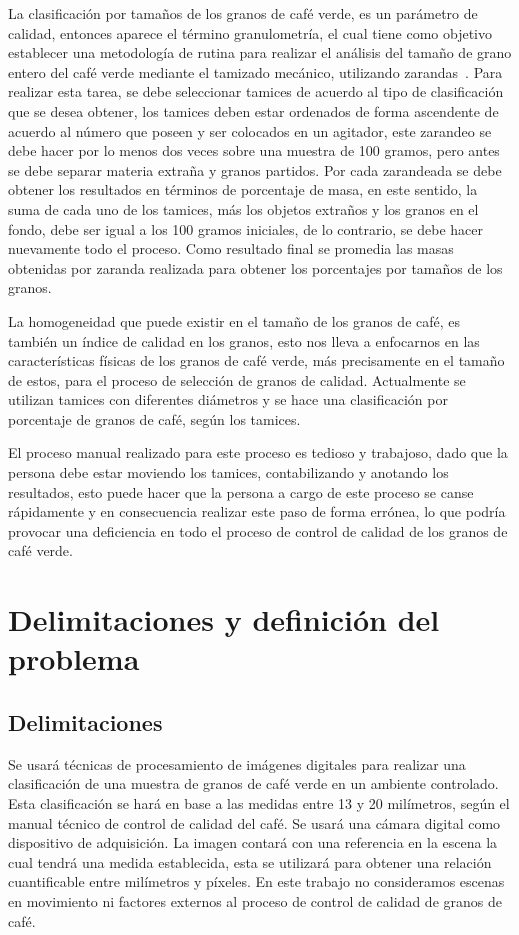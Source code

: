 La clasificación por tamaños de los granos de café verde, es un parámetro de calidad, entonces aparece el término granulometría, el cual tiene como objetivo establecer una metodología de rutina para realizar el análisis del tamaño de grano entero del café verde mediante el tamizado mecánico, utilizando zarandas~\citep{Funez2010}. Para realizar esta tarea, se debe seleccionar tamices de acuerdo al tipo de clasificación que se desea obtener, los tamices deben estar ordenados de forma ascendente de acuerdo al número que poseen y ser colocados en un agitador, este zarandeo se debe hacer por lo menos dos veces sobre una muestra de 100 gramos, pero antes se debe separar materia extraña y granos partidos. Por cada zarandeada se debe obtener los resultados en términos de porcentaje de masa, en este sentido, la suma de cada uno de los tamices, más los objetos extraños y los granos en el fondo, debe ser igual a los 100 gramos iniciales, de lo contrario, se debe hacer nuevamente todo el proceso. Como resultado final se promedia las masas obtenidas por zaranda realizada para obtener los porcentajes por tamaños de los granos.

La homogeneidad que puede existir en el tamaño de los granos de café, es también un índice de calidad en los granos, esto nos lleva a enfocarnos en las características físicas de los granos de café verde, más precisamente en el tamaño de estos, para el proceso de selección de granos de calidad. Actualmente se utilizan tamices con diferentes diámetros y se hace una clasificación por porcentaje de granos de café, según los tamices.

El proceso manual realizado para este proceso es tedioso y trabajoso, dado que la persona debe estar moviendo los tamices, contabilizando y anotando los resultados, esto puede hacer que la persona a cargo de este proceso se canse rápidamente y en consecuencia realizar este paso de forma errónea, lo que podría provocar una deficiencia en todo el proceso de control de calidad de los granos de café verde.


\section{Delimitaciones y definición del problema}

\subsection{Delimitaciones}
Se usará técnicas de procesamiento de imágenes digitales para realizar una clasificación de una muestra de granos de café verde en un ambiente controlado. Esta clasificación se hará en base a las medidas entre 13 y 20 milímetros, según el manual técnico de control de calidad del café. Se usará una cámara digital como dispositivo de adquisición. La imagen contará con una referencia en la escena la cual tendrá una medida establecida, esta se utilizará para obtener una relación cuantificable entre milímetros y píxeles. En este trabajo no consideramos escenas en movimiento ni factores externos al proceso de control de calidad de granos de café.

